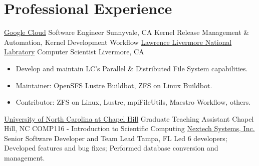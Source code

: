 \section{Professional Experience}
		{\href{http://www.google.com}{Google Cloud}}
		{Software Engineer}
		{Sunnyvale, CA}{}
		{Kernel Release Management \& Automation, Kernel Development Workflow}
		{\href{http://www.llnl.gov}{Lawrence Livermore National Labratory}}
		{Computer Scientist}
		{Livermore, CA}{}
		{\begin{itemize}
		\item Develop and maintain LC's Parallel \& Distributed File System capabilities.
		\item Maintainer: OpenSFS Lustre Buildbot, ZFS on Linux Buildbot.
		\item Contributor: ZFS on Linux, Lustre, mpiFileUtils, Maestro Workflow, others.
		\end{itemize}}
		{\href{http://www.unc.edu}{University of North Carolina at Chapel Hill}}
		{Graduate Teaching Assistant}
		{Chapel Hill, NC}{}
		{COMP116 - Introduction to Scientific Computing}
		{\href{http://www.nextech.com}{Nextech Systems, Inc.}}
		{Senior Software Developer and Team Lead}
		{Tampa, FL}{}
		{Led 6 developers; Developed features and
		bug fixes; Performed database conversion and management.}

